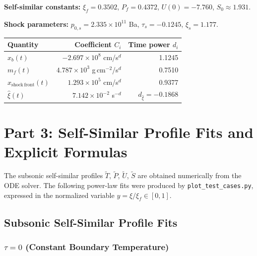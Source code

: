 \documentclass[11pt]{article}
\newcommand{\xsi}{\xi}
\newcommand{\xsif}{\xi_f}
\newcommand{\xsis}{\xi_s}
\begin{document}
\textbf{Self-similar constants:}
$\xsif = 0.3502$, \quad $P_f = 0.4372$, \quad $U(0) = -7.760$, \quad $S_0 \approx 1.931$.

\textbf{Shock parameters:}
$p_{0,s} = 2.335\times10^{11}$ Ba, \quad $\tau_s = -0.1245$, \quad $\xsis = 1.177$.

\begin{center}
\begin{tabular}{l r r}
\toprule
Quantity & Coefficient $C_i$ & Time power $d_i$ \\
\midrule
$x_b(t)$ & $-2.697 \times 10^{8}$ cm/s$^{d}$ & 1.1245 \\
$m_f(t)$ & $4.787 \times 10^{3}$ g\,cm$^{-2}$/s$^{d}$ & 0.7510 \\
$x_{\mathrm{shock\,front}}(t)$ & $1.293 \times 10^{5}$ cm/s$^{d}$ & 0.9377 \\
$\hat{\xsi}(t)$ & $7.142\times10^{-2}$ s$^{-d}$ & $d_{\hat{\xsi}} = -0.1868$ \\
\bottomrule
\end{tabular}
\end{center}

\section{Part 3: Self-Similar Profile Fits and Explicit Formulas}
\label{sec:fits}

The subsonic self-similar profiles $\tilde{T}$, $\tilde{P}$, $\tilde{U}$, $\tilde{S}$ are obtained numerically from the ODE solver. The following power-law fits were produced by \texttt{plot\_test\_cases.py}, expressed in the normalized variable $y = \xsi/\xsif \in [0,1]$.

\subsection{Subsonic Self-Similar Profile Fits}

\subsubsection{$\tau = 0$ (Constant Boundary Temperature)}
\end{document}
